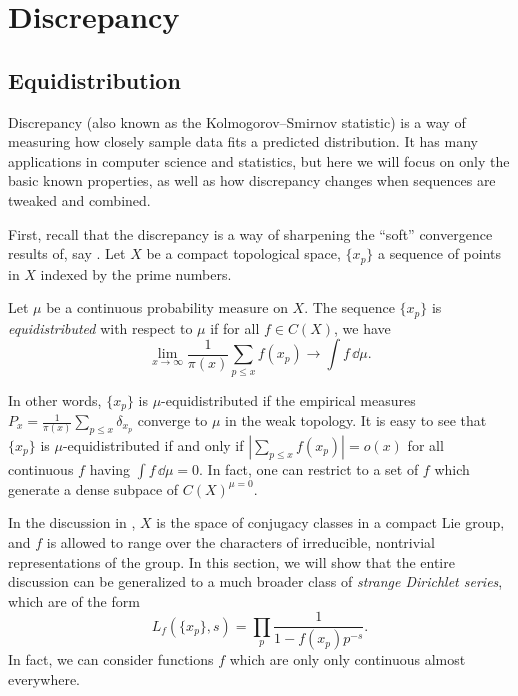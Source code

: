 
\chapter{Discrepancy}





\section{Equidistribution}

Discrepancy (also known as the Kolmogorov--Smirnov statistic) is a way of 
measuring how closely sample data fits a predicted distribution. It has many 
applications in computer science and statistics, but here we will focus on only 
the basic known properties, as well as how discrepancy changes when sequences 
are tweaked and combined. 

First, recall that the discrepancy is a way of sharpening the ``soft'' 
convergence results of, say \cite[A.1]{serre-1989}. Let $X$ be a compact 
topological space, $\{x_p\}$ a sequence of points in $X$ indexed by the prime 
numbers. 

\begin{definition}
Let $\mu$ be a continuous probability measure on $X$. The sequence $\{x_p\}$ is 
\emph{equidistributed} with respect to $\mu$ if for all $f\in C(X)$, we have 
\[
	\lim_{x\to \infty} \frac{1}{\pi(x)} \sum_{p\leqslant x} f(x_p) \to \int f\, \dd \mu .
\]
\end{definition}

In other words, $\{x_p\}$ is $\mu$-equidistributed if the empirical measures 
$P_x = \frac{1}{\pi(x)} \sum_{p\leqslant x} \delta_{x_p}$ converge to $\mu$ in 
the weak topology. It is easy to see that $\{x_p\}$ is $\mu$-equidistributed if 
and only if $\left| \sum_{p\leqslant x} f(x_p)\right| = o(x)$ for all 
continuous $f$ having $\int f\, \dd\mu = 0$. In fact, one can restrict to a 
set of $f$ which generate a dense subpace of $C(X)^{\mu =0}$. 

In the discussion in \cite[A.1]{serre-1989}, $X$ is the space of conjugacy 
classes in a compact Lie group, and $f$ is allowed to range over the characters 
of irreducible, nontrivial representations of the group. In this section, we 
will show that the entire discussion can be generalized to a much broader class 
of \emph{strange Dirichlet series}, which are of the form 
\[
	L_f(\{x_p\},s) = \prod_p \frac{1}{1-f(x_p)p^{-s}} .
\]
In fact, we can consider functions $f$ which are only only continuous almost 
everywhere. 


